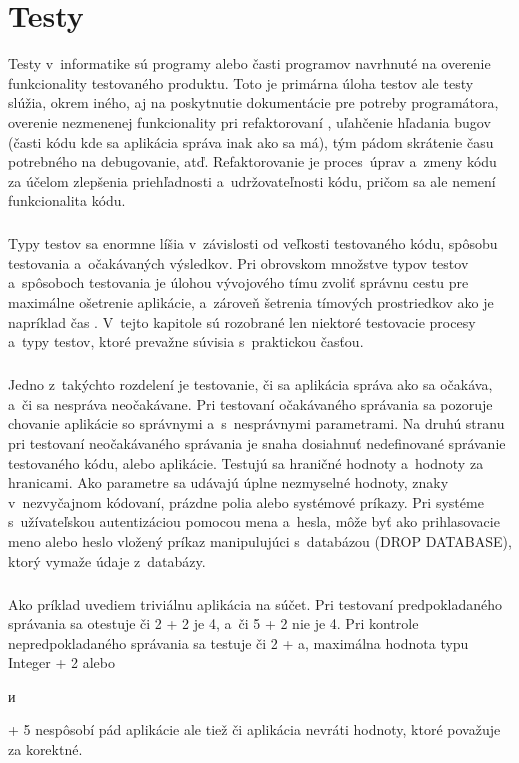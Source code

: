 \documentclass[
  printed, %
  table,   %
oneside,
  nolof,     %
  nolot,     %
]{fithesis3}
\begin{document}
\chapter{Testy}
Testy v~informatike sú programy alebo časti programov navrhnuté na overenie funkcionality testovaného produktu. Toto je primárna úloha testov ale testy slúžia, okrem iného, aj na poskytnutie dokumentácie pre potreby programátora, overenie nezmenenej funkcionality pri refaktorovaní \cite{refact}, uľahčenie hľadania bugov (časti kódu kde sa aplikácia správa inak ako sa má), tým pádom skrátenie času potrebného na debugovanie, atď. Refaktorovanie je proces~úprav a~zmeny kódu za účelom zlepšenia priehľadnosti a~udržovateľnosti kódu, pričom sa ale nemení funkcionalita kódu.
 \paragraph{}
Typy testov sa enormne líšia v~závislosti od veľkosti testovaného kódu, spôsobu testovania a~očakávaných výsledkov. Pri obrovskom množstve typov testov a~spôsoboch testovania je úlohou vývojového tímu zvoliť správnu cestu pre maximálne ošetrenie aplikácie, a~zároveň šetrenia tímových prostriedkov ako je napríklad čas \cite{ssl}. V~tejto kapitole sú rozobrané len niektoré testovacie procesy a~typy testov, ktoré prevažne súvisia s~praktickou časťou.\paragraph{}
Jedno z~takýchto rozdelení je  testovanie, či sa aplikácia správa ako sa očakáva, a~či sa nespráva neočakávane. Pri testovaní očakávaného správania sa pozoruje chovanie aplikácie so správnymi a~s~nesprávnymi parametrami. Na druhú stranu pri testovaní neočakávaného správania je snaha dosiahnuť nedefinované správanie  testovaného kódu, alebo aplikácie. Testujú sa hraničné hodnoty a~hodnoty za hranicami. Ako parametre sa udávajú úplne nezmyselné hodnoty, znaky v~nezvyčajnom kódovaní, prázdne polia alebo systémové príkazy. Pri systéme s~užívateľskou  autentizáciou pomocou mena a~hesla, môže byť ako prihlasovacie meno alebo heslo vložený príkaz manipulujúci s~databázou (DROP DATABASE), ktorý vymaže údaje z~databázy. \paragraph{}
Ako príklad uvediem triviálnu aplikácia na súčet. Pri testovaní predpokladaného správania sa otestuje či 2 + 2 je 4, a~či 5 + 2 nie je 4. Pri kontrole nepredpokladaného správania sa testuje či 2 + a, maximálna hodnota typu Integer + 2 alebo \begin{otherlanguage}{russian} и \end{otherlanguage}  + 5 nespôsobí pád aplikácie ale tiež či aplikácia nevráti hodnoty, ktoré považuje za korektné. \paragraph{}
\end{document}
